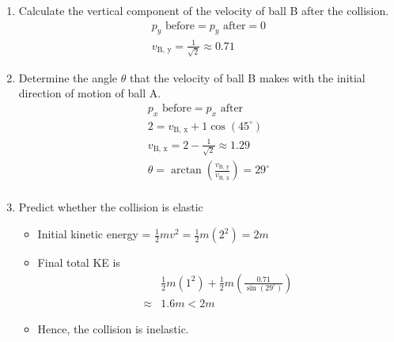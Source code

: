 \documentclass[a4paper,12pt]{article}
\newcommand{\degsym}{^{\circ}}
\begin{document}
\begin{enumerate}[label=(\alph*)]
  \item Calculate the vertical component of the velocity of ball B after the collision.
        \begin{align*}
          p_y \text{ before} = p_y \text{ after} = 0 \\
          v_\text{B, y} = \frac{1}{\sqrt{2}} \approx 0.71
        \end{align*}
  \item Determine the angle $\theta$ that the velocity of ball B makes with the initial direction of motion of ball A.
        \begin{align*}
          p_x \text{ before} = p_x \text{ after}                                       \\
          2 = v_\text{B, x} + 1\cos(45\degsym)                                         \\
          v_\text{B, x} = 2 - \frac{1}{\sqrt{2}} \approx 1.29                          \\
          \theta = \arctan\left(\frac{v_\text{B, y}}{v_\text{B, x}}\right) = 29\degsym \\
        \end{align*}
  \item Predict whether the collision is elastic
        \begin{itemize}
          \item Initial kinetic energy = $\frac{1}{2}mv^2 = \frac{1}{2}m(2^2) = 2m$
          \item Final total KE is
                \begin{align*}
                          & \frac{1}{2}m(1^2) + \frac{1}{2}m\left(\frac{0.71}{\sin(29\degsym)}\right) \\
                  \approx & 1.6m < 2m
                \end{align*}
          \item Hence, the collision is inelastic.
        \end{itemize}
\end{enumerate}
\end{document}
